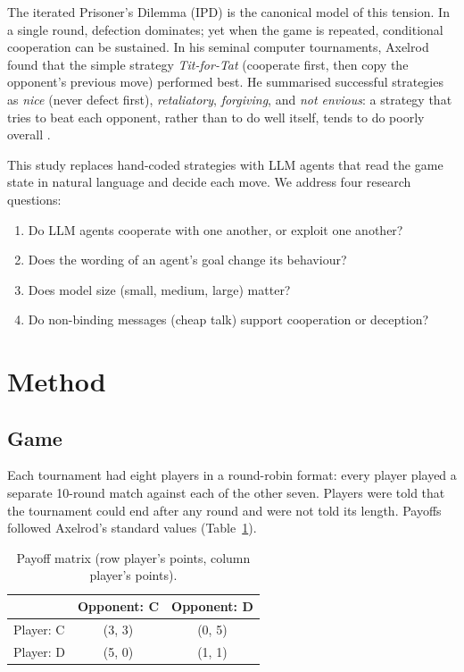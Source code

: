 \documentclass[11pt,a4paper]{article}
\begin{document}
The iterated Prisoner's Dilemma (IPD) is the canonical model of this tension. In a single round, defection dominates; yet when the game is repeated, conditional cooperation can be sustained. In his seminal computer tournaments, Axelrod \citep{axelrod1980,axelrod1984} found that the simple strategy \emph{Tit-for-Tat} (cooperate first, then copy the opponent's previous move) performed best. He summarised successful strategies as \emph{nice} (never defect first), \emph{retaliatory}, \emph{forgiving}, and \emph{not envious}: a strategy that tries to beat each opponent, rather than to do well itself, tends to do poorly overall \citep{axelrod1981}.

This study replaces hand-coded strategies with LLM agents that read the game state in natural language and decide each move. We address four research questions:

\begin{enumerate}[label=\textbf{RQ\arabic*.}]
  \item Do LLM agents cooperate with one another, or exploit one another?
  \item Does the wording of an agent's goal change its behaviour?
  \item Does model size (small, medium, large) matter?
  \item Do non-binding messages (cheap talk) support cooperation or deception?
\end{enumerate}

\section{Method}

\subsection{Game}

Each tournament had eight players in a round-robin format: every player played a separate 10-round match against each of the other seven. Players were told that the tournament could end after any round and were not told its length. Payoffs followed Axelrod's standard values (Table~\ref{tab:payoff}).

\begin{table}[htbp]
\centering
\caption{Payoff matrix (row player's points, column player's points).}
\label{tab:payoff}
\begin{tabular}{lcc}
\toprule
 & Opponent: C & Opponent: D \\
\midrule
Player: C & (3, 3) & (0, 5) \\
Player: D & (5, 0) & (1, 1) \\
\bottomrule
\end{tabular}
\end{table}
\end{document}
